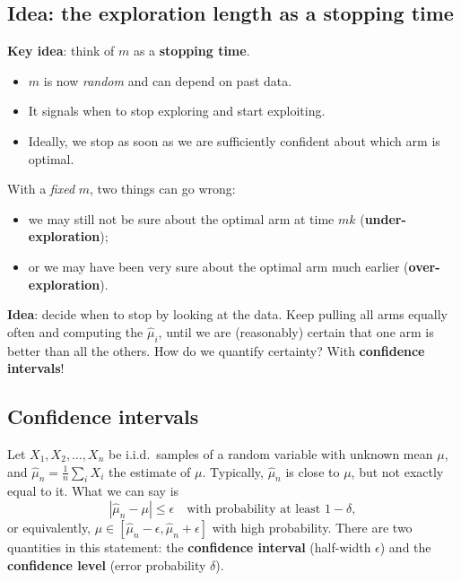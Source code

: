 \subsection{Idea: the exploration length as a stopping time}

\textbf{Key idea}: think of $m$ as a \textbf{stopping time}.
\begin{itemize}
    \item $m$ is now \emph{random} and can depend on past data.
    \item It signals when to stop exploring and start exploiting.
    \item Ideally, we stop as soon as we are sufficiently confident about which arm is optimal.
\end{itemize}

With a \emph{fixed} $m$, two things can go wrong:
\begin{itemize}
    \item we may still not be sure about the optimal arm at time $mk$ (\textbf{under-exploration});
    \item or we may have been very sure about the optimal arm much earlier (\textbf{over-exploration}).
\end{itemize}

\textbf{Idea}: decide when to stop by looking at the data. Keep pulling all arms equally often and computing the $\hat{\mu}_i$, until we are (reasonably) certain that one arm is better than all the others. How do we quantify certainty? With \textbf{confidence intervals}!

\subsection{Confidence intervals}

Let $X_1, X_2, \dots, X_n$ be i.i.d.\ samples of a random variable with unknown mean $\mu$, and $\hat{\mu}_n = \frac{1}{n}\sum_{i} X_i$ the estimate of $\mu$. Typically, $\hat{\mu}_n$ is close to $\mu$, but not exactly equal to it. What we can say is
\[
|\hat{\mu}_n - \mu| \leq \epsilon \quad \text{with probability at least } 1 - \delta,
\]
or equivalently, $\mu \in [\hat{\mu}_n - \epsilon, \hat{\mu}_n + \epsilon]$ with high probability. There are two quantities in this statement: the \textbf{confidence interval} (half-width $\epsilon$) and the \textbf{confidence level} (error probability $\delta$).

